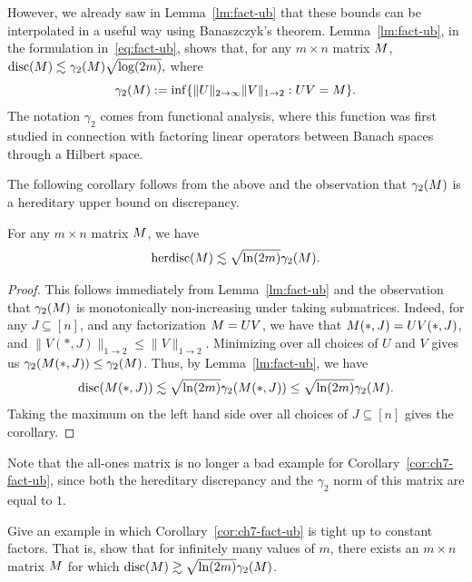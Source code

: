 However, we already saw in Lemma~\ref{lm:fact-ub}
that these bounds can be interpolated in a useful way using
Banaszczyk's theorem. Lemma~\ref{lm:fact-ub}, in the formulation
in~\eqref{eq:fact-ub}, shows that, for any $m\times n$ matrix $M$,
\(
\operatorname{disc}(M) \lesssim \gamma_2(M)\sqrt{\log(2m)},
\)
where
\begin{equation}\label{eq:ch7-gamma2-defn}
 \gamma_2(M) := \inf\{\|U\|_{2\to\infty}\|V\|_{1\to2}: UV = M\}.
\end{equation}
The notation $\gamma_2$ comes from functional analysis,
where this function was first studied in connection with factoring
linear operators between Banach spaces through a Hilbert space. 

The following corollary follows from the above and the observation
that $\gamma_2(M)$ is a hereditary upper bound on discrepancy.

\begin{corollary}\label{cor:ch7-fact-ub} 
  For any $m\times n$ matrix $M$, we have
  \[
    \operatorname{herdisc}(M) \lesssim \sqrt{\ln(2m)} \gamma_2(M).
  \]
\end{corollary}
\begin{proof}
  This follows immediately from Lemma~\ref{lm:fact-ub}
  and the observation that $\gamma_2(M)$ is monotonically
  non-increasing under taking submatrices. Indeed, for any $J
  \subseteq [n]$, and any  factorization $M = UV$, we have that
  $M(*,J) = UV(*,J)$, and $\|V(*,J)\|_{1\to 2} \le \|V\|_{1\to 2}$. Minimizing over all choices of $U$ and $V$
  gives us $\gamma_2(M(*,J)) \le \gamma_2(M)$. Thus, by
  Lemma~\ref{lm:fact-ub}, we have
  \[
    \operatorname{disc}(M(*,J)) \lesssim \sqrt{\ln(2m)} \gamma_2(M(*,J))
    \le
    \sqrt{\ln(2m)} \gamma_2(M).
  \]
  Taking the maximum on the left hand side over all choices of $J\subseteq[n]$ gives the
  corollary. 
\end{proof}

Note that the all-ones matrix is no longer a bad example for
Corollary~\ref{cor:ch7-fact-ub}, since both the hereditary discrepancy
and the $\gamma_2$ norm of this matrix are equal to $1$. 

\begin{exercise}\label{ex:ch7-fact-ub}
  Give an example in which Corollary~\ref{cor:ch7-fact-ub} is tight up
  to constant factors. That is, show that for infinitely many values of
  $m$, there exists an $m\times n$ matrix $M$ for which
  $\operatorname{disc}(M) \gtrsim \sqrt{\ln(2m)} \gamma_2(M)$.
\end{exercise}

